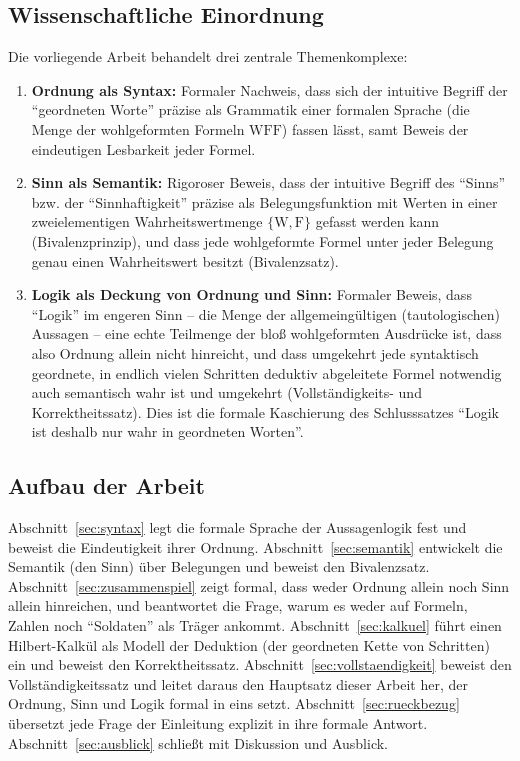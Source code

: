 \documentclass[12pt, a4paper]{article}
\theoremstyle{definition}
\theoremstyle{remark}
\newcommand{\W}{\mathrm{W}}
\newcommand{\F}{\mathrm{F}}
\newcommand{\WFF}{\mathrm{WFF}}
\begin{document}
\subsection{Wissenschaftliche Einordnung}
\label{subsec:einordnung}

Die vorliegende Arbeit behandelt drei zentrale Themenkomplexe:

\begin{enumerate}[label=(\roman*)]
  \item \textbf{Ordnung als Syntax:} Formaler Nachweis, dass sich der intuitive Begriff der ``geordneten Worte'' präzise als Grammatik einer formalen Sprache (die Menge der wohlgeformten Formeln $\WFF$) fassen lässt, samt Beweis der eindeutigen Lesbarkeit jeder Formel.

  \item \textbf{Sinn als Semantik:} Rigoroser Beweis, dass der intuitive Begriff des ``Sinns'' bzw. der ``Sinnhaftigkeit'' präzise als Belegungsfunktion mit Werten in einer zweielementigen Wahrheitswertmenge $\{\W, \F\}$ gefasst werden kann (Bivalenzprinzip), und dass jede wohlgeformte Formel unter jeder Belegung genau einen Wahrheitswert besitzt (Bivalenzsatz).

  \item \textbf{Logik als Deckung von Ordnung und Sinn:} Formaler Beweis, dass ``Logik'' im engeren Sinn -- die Menge der allgemeingültigen (tautologischen) Aussagen -- eine echte Teilmenge der bloß wohlgeformten Ausdrücke ist, dass also Ordnung allein nicht hinreicht, und dass umgekehrt jede syntaktisch geordnete, in endlich vielen Schritten deduktiv abgeleitete Formel notwendig auch semantisch wahr ist und umgekehrt (Vollständigkeits- und Korrektheitssatz). Dies ist die formale Kaschierung des Schlusssatzes ``Logik ist deshalb nur wahr in geordneten Worten''.
\end{enumerate}

\subsection{Aufbau der Arbeit}
\label{subsec:aufbau}

Abschnitt~\ref{sec:syntax} legt die formale Sprache der Aussagenlogik fest und beweist die Eindeutigkeit ihrer Ordnung. Abschnitt~\ref{sec:semantik} entwickelt die Semantik (den Sinn) über Belegungen und beweist den Bivalenzsatz. Abschnitt~\ref{sec:zusammenspiel} zeigt formal, dass weder Ordnung allein noch Sinn allein hinreichen, und beantwortet die Frage, warum es weder auf Formeln, Zahlen noch ``Soldaten'' als Träger ankommt. Abschnitt~\ref{sec:kalkuel} führt einen Hilbert-Kalkül als Modell der Deduktion (der geordneten Kette von Schritten) ein und beweist den Korrektheitssatz. Abschnitt~\ref{sec:vollstaendigkeit} beweist den Vollständigkeitssatz und leitet daraus den Hauptsatz dieser Arbeit her, der Ordnung, Sinn und Logik formal in eins setzt. Abschnitt~\ref{sec:rueckbezug} übersetzt jede Frage der Einleitung explizit in ihre formale Antwort. Abschnitt~\ref{sec:ausblick} schließt mit Diskussion und Ausblick.
\end{document}
